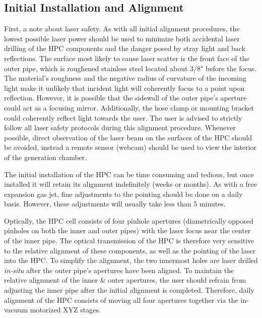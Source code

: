 \subsection{Initial Installation and Alignment}
\label{app:initial-alignment-HPC}
First, a note about laser safety. As with all initial alignment procedures, the lowest possible laser power should be used to minimize both accidental laser drilling of the HPC components and the danger posed by stray light and back reflections. The surface most likely to cause laser scatter is the front face of the outer pipe, which is roughened stainless steel located about 3/8" before the focus. The material's roughness and the negative radius of curvature of the incoming light make it unlikely that incident light will coherently focus to a point upon reflection. However, it is possible that the sidewall of the outer pipe's aperture could act as a focusing mirror. Additionally, the hose clamp or mounting bracket could coherently reflect light towards the user. The user is advised to strictly follow all laser safety protocols during this alignment procedure. Whenever possible, direct observation of the laser beam on the surfaces of the HPC should be avoided, instead a remote sensor (webcam) should be used to view the interior of the generation chamber.

The initial installation of the HPC can be time consuming and tedious, but once installed it will retain its alignment indefinitely (weeks or months). As with a free expansion gas jet, fine adjustments to the pointing should be done on a daily basis. However, these adjustments will usually take less than 5 minutes.

Optically, the HPC cell consists of four pinhole apertures (diametrically opposed pinholes on both the inner and outer pipes) with the laser focus near the center of the inner pipe. The optical transmission of the HPC is therefore very sensitive to the relative alignment of these components, as well as the pointing of the laser into the HPC. To simplify the alignment, the two innermost holes are laser drilled \textit{in-situ} after the outer pipe's apertures have been aligned. To maintain the relative alignment of the inner \& outer apertures, the user should refrain from adjusting the inner pipe after the initial alignment is completed. Therefore, daily alignment of the HPC consists of moving all four apertures together via the in-vacuum motorized XYZ stages.

